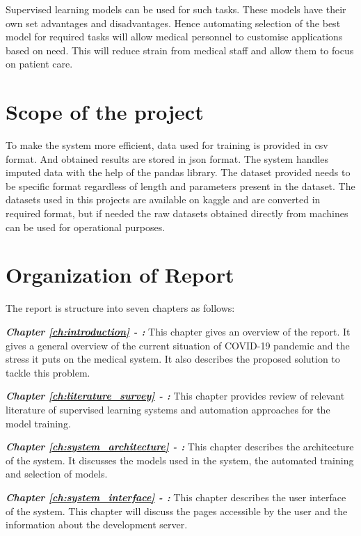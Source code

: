 Supervised learning models can be used for such tasks. These models have their own set advantages and disadvantages. Hence automating selection of the best model for required tasks will allow medical personnel to customise applications based on need. This will reduce strain from medical staff and allow them to focus on patient care.

\section{Scope of the project} \label{sec:scope_of_the_project}

To make the system more efficient, data used for training is provided in csv format. And obtained results are stored in json format. The system handles imputed data with the help of the pandas library. The dataset provided needs to be specific format regardless of length and parameters present in the dataset. The datasets used in this projects are available on kaggle and are converted in required format, but if needed the raw datasets obtained directly from machines can be used for operational purposes.

\section{Organization of Report} \label{sec:organization_of_report}

The report is structure into seven chapters as follows:

\textbf{\textit{Chapter \ref{ch:introduction} - :}}
This chapter gives an overview of the report. It gives a general overview of the current situation of COVID-19 pandemic and the stress it puts on the medical system. It also describes the proposed solution to tackle this problem.

\textbf{\textit{Chapter \ref{ch:literature_survey} - :}}
This chapter provides review of relevant literature of supervised learning systems and automation approaches for the model training.

\textbf{\textit{Chapter \ref{ch:system_architecture} - :}}
This chapter describes the architecture of the system. It discusses the models used in the system, the automated training and selection of models.

\textbf{\textit{Chapter \ref{ch:system_interface} - :}}
This chapter describes the user interface of the system. This chapter will discuss the pages accessible by the user and the information about the development server.

